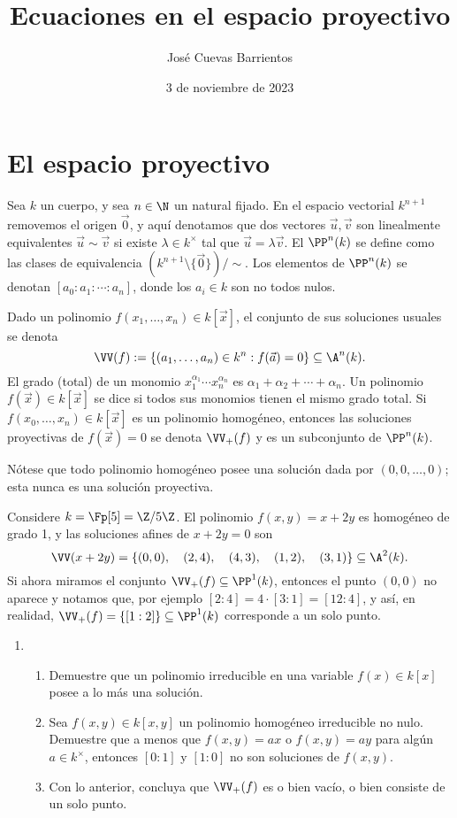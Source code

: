 \documentclass[11pt, reqno]{amsart}
\title{Ecuaciones en el espacio proyectivo}
\date{3 de noviembre de 2023}
\author[José Cuevas]{José Cuevas Barrientos}
\begin{document}
\maketitle

\section{El espacio proyectivo}
\begin{mydef}
	Sea $k$ un cuerpo, y sea $n \in \N$ un natural fijado.
	En el espacio vectorial $k^{n+1}$ removemos el origen $\Vec 0$, y aquí denotamos que dos vectores $\vec u, \vec v$
	son linealmente equivalentes $\vec u \sim \vec v$ si existe $\lambda \in k^\times$ tal que $\vec u = \lambda \vec v$.
	El  $\PP^n(k)$ se define como las clases de equivalencia $(k^{n+1} \setminus \{ \Vec 0 \})/{\sim}$.
	Los elementos de $\PP^n(k)$ se denotan $[a_0 : a_1 : \cdots : a_n]$, donde los $a_i \in k$ son no todos nulos.

	Dado un polinomio $f(x_1, \dots, x_n) \in k[\vec x]$, el conjunto de sus soluciones usuales se denota
	$$ \VV(f) := \{ (a_1, \dots, a_n) \in k^n : f(\vec a) = 0 \} \subseteq \A^n(k). $$
	El grado (total) de un monomio $x_1^{\alpha_1} \cdots x_n^{\alpha_n}$ es $\alpha_1 + \alpha_2 + \cdots + \alpha_n$.
	Un polinomio $f(\vec x) \in k[\vec x]$ se dice  si todos sus monomios tienen el mismo grado total.
	Si $f(x_0, \dots, x_n) \in k[\vec x]$ es un polinomio homogéneo, entonces las soluciones proyectivas de $f(\vec x) = 0$
	se denota $\VV_+(f)$ y es un subconjunto de $\PP^n(k)$.
\end{mydef}
Nótese que todo polinomio homogéneo posee una solución  dada por $(0, 0, \dots, 0)$; esta nunca es una solución proyectiva.

\begin{ex}
	Considere $k = \Fp[5] = \Z/5\Z$.
	El polinomio $f(x, y) = x + 2y$ es homogéneo de grado 1, y las soluciones afines de $x + 2y = 0$ son
	$$ \VV(x + 2y) = \{ (0, 0), \quad (2, 4), \quad (4, 3), \quad (1, 2), \quad (3, 1) \} \subseteq \A^2(k). $$
	Si ahora miramos el conjunto $\VV_+(f) \subseteq \PP^1(k)$, entonces el punto $(0, 0)$ no aparece y notamos que, por ejemplo $[2 : 4] = 4\cdot[3 : 1]
	= [12 : 4]$, y así, en realidad, $\VV_+(f) = \{ [1 : 2] \} \subseteq \PP^1(k)$ corresponde a un solo punto.
\end{ex}

\begin{enumerate}
	\item 
		\begin{enumerate}
			\item Demuestre que un polinomio irreducible en una variable $f(x) \in k[x]$ posee a lo más una solución.
			\item Sea $f(x, y) \in k[x, y]$ un polinomio homogéneo irreducible no nulo.
				Demuestre que a menos que $f(x, y) = ax$ o $f(x, y) = ay$ para algún $a \in k^\times$,
				entonces $[0 : 1]$ y $[1 : 0]$ no son soluciones de $f(x, y)$.
			\item Con lo anterior, concluya que $\VV_+(f)$ es o bien vacío, o bien consiste de un solo punto.
		\end{enumerate}
\end{enumerate}
\end{document}
